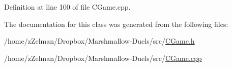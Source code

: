 Definition at line 100 of file C\-Game.\-cpp.



The documentation for this class was generated from the following files\-:\begin{DoxyCompactItemize}
\item 
/home/z\-Zelman/\-Dropbox/\-Marshmallow-\/\-Duels/src/\hyperlink{CGame_8h}{C\-Game.\-h}\item 
/home/z\-Zelman/\-Dropbox/\-Marshmallow-\/\-Duels/src/\hyperlink{CGame_8cpp}{C\-Game.\-cpp}\end{DoxyCompactItemize}
